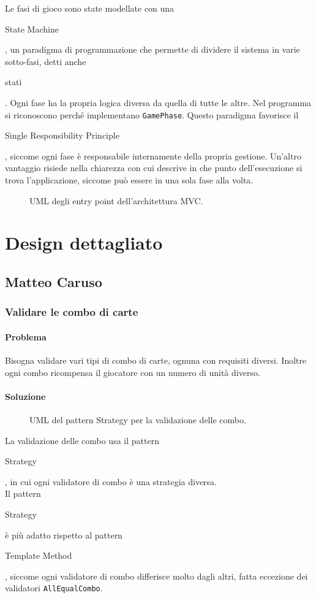 \documentclass[a4paper,12pt]{report}
\begin{document}
Le fasi di gioco sono state modellate con una \begin{itshape}State Machine\end{itshape}, un paradigma di programmazione che permette di dividere il sistema in varie sotto-fasi, detti anche \begin{itshape}stati\end{itshape}. Ogni fase ha la propria logica diversa da quella di tutte le altre. Nel programma si riconoscono perché implementano \texttt{GamePhase}.
Questo paradigma favorisce il \begin{itshape}Single Responsibility Principle\end{itshape}, siccome ogni fase è responsabile internamente della propria gestione.
Un'altro vantaggio risiede nella chiarezza con cui descrive in che punto dell'esecuzione si trova l'applicazione, siccome può essere in una sola fase alla volta.
\begin{figure}[H]
	\centering
	
	\caption{UML degli entry point dell'architettura MVC.}
\end{figure}

\section{Design dettagliato}
\subsection{Matteo Caruso}
\subsubsection{Validare le combo di carte}
\paragraph{Problema}
Bisogna validare vari tipi di combo di carte, ognuna con requisiti diversi. Inoltre ogni combo ricompensa il giocatore con un numero di unità diverso.
\paragraph{Soluzione}
\begin{figure}[H]
	\centering
	
	\caption{UML del pattern Strategy per la validazione delle combo.}
\end{figure}
La validazione delle combo usa il pattern \begin{itshape}Strategy\end{itshape}, in cui ogni validatore di combo è una strategia diversa.
\\
Il pattern \begin{itshape}Strategy\end{itshape} è più adatto rispetto al pattern \begin{itshape}Template Method\end{itshape}, siccome ogni validatore di combo differisce molto dagli altri, fatta eccezione dei validatori \texttt{AllEqualCombo}.
\end{document}
